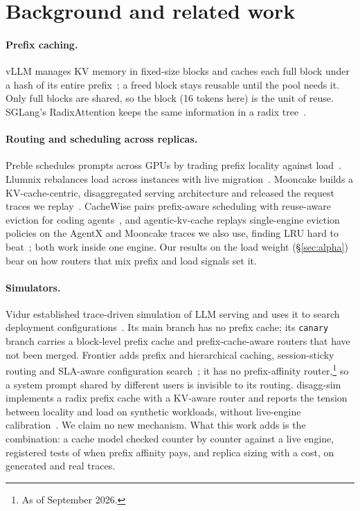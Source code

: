 \documentclass[10pt,twocolumn]{article}
\begin{document}
\section{Background and related work}

\paragraph{Prefix caching.} vLLM manages KV memory in fixed-size blocks and caches each full block
under a hash of its entire prefix~\cite{kwon2023}; a freed block stays reusable until the pool needs
it. Only full blocks are shared, so the block (16 tokens here) is the unit of reuse. SGLang's
RadixAttention keeps the same information in a radix tree~\cite{zheng2023}.

\paragraph{Routing and scheduling across replicas.} Preble schedules prompts across GPUs by trading
prefix locality against load~\cite{srivatsa2024}. Llumnix rebalances load across instances with live
migration~\cite{sun2024}. Mooncake builds a KV-cache-centric, disaggregated serving architecture and
released the request traces we replay~\cite{qin2024,mooncaketraces}. CacheWise pairs prefix-aware
scheduling with reuse-aware eviction for coding agents~\cite{tiwari2026}, and agentic-kv-cache
replays single-engine eviction policies on the AgentX and Mooncake traces we also use, finding LRU
hard to beat~\cite{agentickv}; both work inside one engine. Our results on the load
weight (\S\ref{sec:alpha}) bear on how routers that mix prefix and load signals set it.

\paragraph{Simulators.} Vidur established trace-driven simulation of LLM serving and uses it to
search deployment configurations~\cite{agrawal2024}. Its main branch has no prefix cache; its
\texttt{canary} branch carries a block-level prefix cache and prefix-cache-aware routers that have not
been merged. Frontier adds prefix and hierarchical caching, session-sticky routing and SLA-aware
configuration search~\cite{feng2026}; it has no prefix-affinity router,\footnote{As of September
2026.} so a system prompt shared by different users is invisible to its routing. disagg-sim
implements a radix prefix cache with a KV-aware router and reports the tension between locality and
load on synthetic workloads, without live-engine calibration~\cite{disaggsim}. We claim no new
mechanism. What this work adds is the combination: a cache model checked counter by counter against a
live engine, registered tests of when prefix affinity pays, and replica sizing with a cost, on
generated and real traces.
\end{document}
